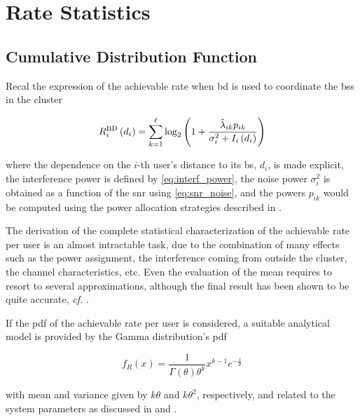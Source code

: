 \section{Rate Statistics}\label{sec:stats_rate_stats}
\subsection{Cumulative Distribution Function}\label{ssec:stats_cdf}

Recal the expression of the achievable rate when \gls{bd} is used to coordinate
the \glspl{bs} in the cluster

\begin{equation} \label{eq:stats_achiev_rate}
    R_i^{\text{BD}}\left(d_i\right) = \sum\limits_{k = 1}^{\ell} \log_2 \left(
    1 + \frac{\hat{\lambda}_{ik} p_{ik}}{\sigma_i^2 + I_i\left(d_i\right)} \right)
\end{equation}

\noindent
where the dependence on the $i$-th user's distance to its \gls{bs}, $d_i$, is
made explicit, the interference power is defined by \eqref{eq:interf_power}, the
noise power $\sigma_i^2$ is obtained as a function of the \gls{snr} using
\eqref{eq:snr_noise}, and the powers $p_{ik}$ would be computed using the power
allocation strategies described in .

The derivation of the complete statistical characterization of the achievable
rate per user is an almost intractable task, due to the combination of many
effects such as the power assignment, the interference coming from outside the
cluster, the channel characteristics, etc. Even the evaluation of the mean
requires to resort to several approximations, although the final result has been
shown to be quite accurate, \emph{cf.} .

If the \gls{pdf} of the achievable rate per user is considered, a suitable
analytical model is provided by the Gamma distribution's \gls{pdf}

\begin{equation} \label{eq:gamma_pdf}
   f_{R}\left(x\right) = \frac{1}{\Gamma\left(\theta\right)\theta^k}x^{k-1}
   e^{-\frac{x}{\theta}}
\end{equation}

\noindent
with mean and variance given by $k\theta$ and $k\theta^2$, respectively, and
related to the system parameters as discussed in  and
.

